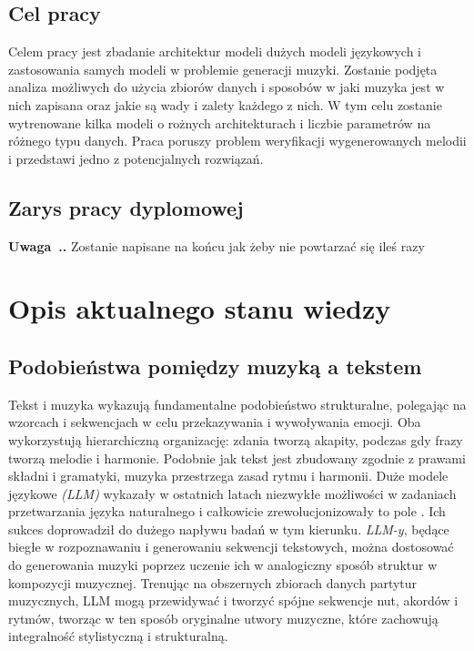 \documentclass[data-science]{agh-wi} %
\newcounter{comment}[chapter]
\newenvironment{comment}[1][]{\begin{shaded}\refstepcounter{comment}
\noindent \textbf{Uwaga~\thechapter.\thecomment. #1} \rmfamily}{\end{shaded}}
\begin{document}
\section{Cel pracy}
Celem pracy jest zbadanie architektur modeli dużych modeli językowych i zastosowania samych modeli w problemie generacji muzyki. Zostanie podjęta analiza możliwych do użycia zbiorów danych i sposobów w jaki muzyka jest w nich zapisana oraz jakie są wady i zalety każdego z nich. W tym celu zostanie wytrenowane kilka modeli o rożnych architekturach i liczbie parametrów na różnego typu danych. Praca poruszy problem weryfikacji wygenerowanych melodii i przedstawi jedno z potencjalnych rozwiązań.

\section{Zarys pracy dyplomowej}
\begin{comment}
Zostanie napisane na końcu jak żeby nie powtarzać się ileś razy
\end{comment}
\chapter{Opis aktualnego stanu wiedzy}
\section{Podobieństwa pomiędzy muzyką a tekstem}
Tekst i muzyka wykazują fundamentalne podobieństwo strukturalne, polegając na wzorcach i sekwencjach w celu przekazywania i wywoływania emocji. Oba wykorzystują hierarchiczną organizację: zdania tworzą akapity, podczas gdy frazy tworzą melodie i harmonie. Podobnie jak tekst jest zbudowany zgodnie z prawami składni i gramatyki, muzyka przestrzega zasad rytmu i harmonii. Duże modele językowe \textit{(LLM)} wykazały w ostatnich latach niezwykłe możliwości w zadaniach przetwarzania języka naturalnego i całkowicie zrewolucjonizowały to pole \cite{adiwardana2020humanlike, end_of_nlp}. Ich sukces doprowadził do dużego napływu badań w tym kierunku. \textit{LLM-y}, będące biegłe w rozpoznawaniu i generowaniu sekwencji tekstowych, można dostosować do generowania muzyki poprzez uczenie ich w analogiczny sposób struktur w kompozycji muzycznej. Trenując na obszernych zbiorach danych partytur muzycznych, LLM mogą przewidywać i tworzyć spójne sekwencje nut, akordów i rytmów, tworząc w ten sposób oryginalne utwory muzyczne, które zachowują integralność stylistyczną i strukturalną.
\end{document}
